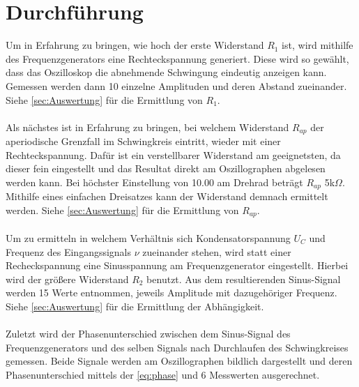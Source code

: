 \section{Durchführung}
\label{sec:Durchführung}

Um in Erfahrung zu bringen, wie hoch der erste Widerstand \(R_1\) ist, wird mithilfe des Frequenzgenerators eine Rechteckspannung generiert.
Diese wird so gewählt, dass das Oszilloskop die abnehmende Schwingung eindeutig anzeigen kann.
Gemessen werden dann 10 einzelne Amplituden und deren Abstand zueinander.
Siehe \autoref{sec:Auswertung} für die Ermittlung von \(R_1\).
\\\\
Als nächstes ist in Erfahrung zu bringen, bei welchem Widerstand \(R_{ap}\) der aperiodische Grenzfall im Schwingkreis eintritt, wieder mit einer Rechteckspannung.
Dafür ist ein verstellbarer Widerstand am geeignetsten, da dieser fein eingestellt und das Resultat direkt am Oszillographen abgelesen werden kann.
Bei höchster Einstellung von 10.00 am Drehrad beträgt \(R_{ap}\) 5k\(\Omega\). Mithilfe eines einfachen Dreisatzes kann der Widerstand demnach ermittelt werden.
Siehe \autoref{sec:Auswertung} für die Ermittlung von \(R_{ap}\).
\\\\
Um zu ermitteln in welchem Verhältnis sich Kondensatorspannung \(U_C\) und Frequenz des Eingangssignals \(\nu\) zueinander stehen, wird statt einer Recheckspannung eine Sinusspannung am Frequenzgenerator eingestellt.
Hierbei wird der größere Widerstand \(R_2\) benutzt.
Aus dem resultierenden Sinus-Signal werden 15 Werte entnommen, jeweils Amplitude mit dazugehöriger Frequenz.
Siehe \autoref{sec:Auswertung} für die Ermittlung der Abhängigkeit. 
\\\\
Zuletzt wird der Phasenunterschied zwischen dem Sinus-Signal des Frequenzgenerators und des selben Signals nach Durchlaufen des Schwingkreises gemessen.
Beide Signale werden am Oszillographen bildlich dargestellt und deren Phasenunterschied mittels der \autoref{eq:phase} und 6 Messwerten ausgerechnet.
